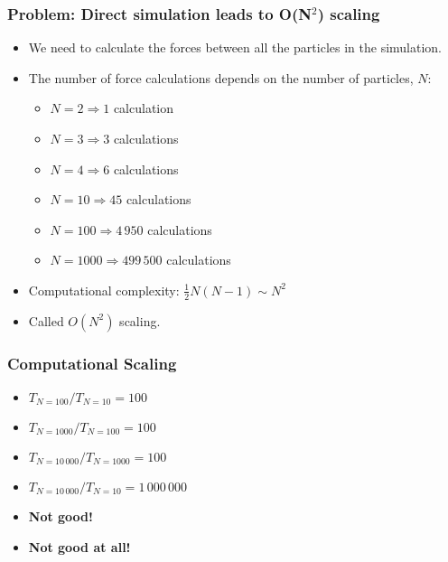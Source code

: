 
\subtitle{Barnes-Hut Algorithm}



\begin{frame}
  \titlepage
\end{frame}

\begin{frame}
  \frametitle{Problem: Direct simulation leads to O(N$^2$) scaling}
  \begin{itemize}
    \item We need to calculate the forces between all the particles in the simulation.
    \item The number of force calculations depends on the number of particles, \( N \):
    \begin{itemize}
      \item \( N = 2 \Rightarrow 1 \) calculation
      \item \( N = 3 \Rightarrow 3 \) calculations
      \item \( N = 4 \Rightarrow 6 \) calculations
      \item \( N = 10 \Rightarrow 45 \) calculations
      \item \( N = 100 \Rightarrow 4\,950 \) calculations
      \item \( N = 1000 \Rightarrow 499\,500 \) calculations
    \end{itemize}
    \item Computational complexity: $ \frac{1}{2}N(N-1) \sim N^2$
    \item Called $O(N^2)$ scaling.
  \end{itemize}
\end{frame}

\begin{frame}
  \frametitle{Computational Scaling}
  \begin{itemize}
    \item \( T_{N=100} / T_{N=10} = 100 \)
    \item \( T_{N=1000} / T_{N=100} = 100 \)
    \item \( T_{N=10\,000} / T_{N=1000} = 100 \)
    \item \( T_{N=10\,000} / T_{N=10} = 1\,000\,000 \)
    \item<2> \textbf{Not good!}
    \item<3> \textbf{Not good at all!}
  \end{itemize}
\end{frame}

